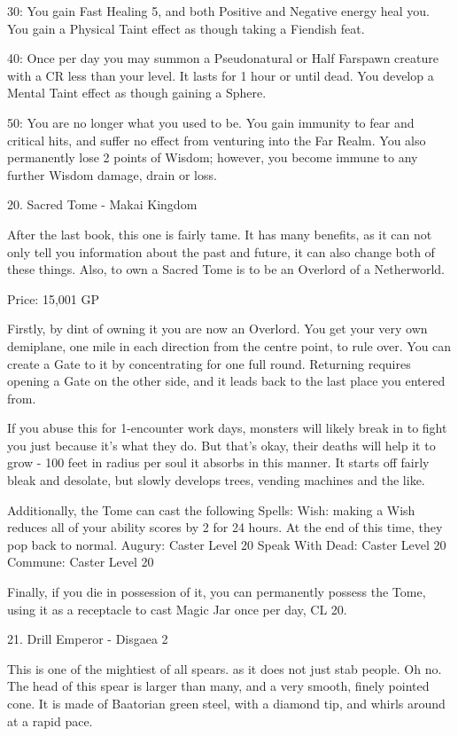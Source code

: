 \begin{multicols}{2}
30: You gain Fast Healing 5, and both Positive and Negative energy heal you. You gain a Physical Taint effect as though taking a Fiendish feat.

40: Once per day you may summon a Pseudonatural or Half Farspawn creature with a CR less than your level. It lasts for 1 hour or until dead. You develop a Mental Taint effect as though gaining a Sphere.

50: You are no longer what you used to be. You gain immunity to fear and critical hits, and suffer no effect from venturing into the Far Realm. You also permanently lose 2 points of Wisdom; however, you become immune to any further Wisdom damage, drain or loss.


20. Sacred Tome - Makai Kingdom

After the last book, this one is fairly tame. It has many benefits, as it can not only tell you information about the past and future, it can also change both of these things. Also, to own a Sacred Tome is to be an Overlord of a Netherworld.

Price: 15,001 GP

Firstly, by dint of owning it you are now an Overlord. You get your very own demiplane, one mile in each direction from the centre point, to rule over. You can create a Gate to it by concentrating for one full round. Returning requires opening a Gate on the other side, and it leads back to the last place you entered from.

If you abuse this for 1-encounter work days, monsters will likely break in to fight you just because it's what they do. But that's okay, their deaths will help it to grow - 100 feet in radius per soul it absorbs in this manner. It starts off fairly bleak and desolate, but slowly develops trees, vending machines and the like.

Additionally, the Tome can cast the following Spells:
Wish: making a Wish reduces all of your ability scores by 2 for 24 hours. At the end of this time, they pop back to normal.
Augury: Caster Level 20
Speak With Dead: Caster Level 20
Commune: Caster Level 20

Finally, if you die in possession of it, you can permanently possess the Tome, using it as a receptacle to cast Magic Jar once per day, CL 20.


21. Drill Emperor - Disgaea 2

This is one of the mightiest of all spears. as it does not just stab people. Oh no. The head of this spear is larger than many, and a very smooth, finely pointed cone. It is made of Baatorian green steel, with a diamond tip, and whirls around at a rapid pace.


\end{multicols}
